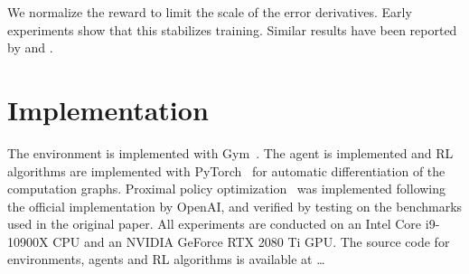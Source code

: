 We normalize the reward to limit the scale of the error derivatives.
Early experiments show that this stabilizes training.
Similar results have been reported by \cite{andrychowicz_empirical_2020} and \cite{mnih_atari_2013}.

\section{Implementation}

The environment is implemented with Gym~\cite{brockman_gym_2016}. The agent is implemented and RL algorithms are implemented with PyTorch~\cite{paszke_pytorch_nodate} for automatic differentiation of the computation graphs.
Proximal policy optimization~\cite{schulman_ppo_2017} was implemented following the official implementation by OpenAI,
and verified by testing on the benchmarks used in the original paper.
All experiments are conducted on an Intel Core i9-10900X CPU and an NVIDIA GeForce RTX 2080 Ti GPU.
The source code for environments, agents and RL algorithms is available at \dots
{}







